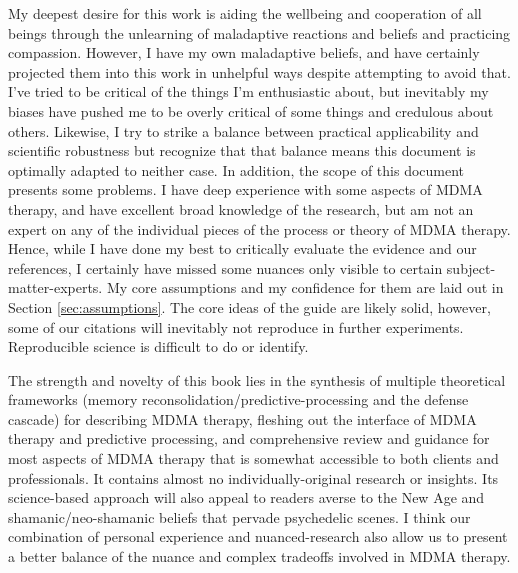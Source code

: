 \documentclass[12pt,letterpaper]{book}
\begin{document}

My deepest desire for this work is aiding the wellbeing and cooperation of all beings through the unlearning of maladaptive reactions and beliefs and practicing compassion. However, I have my own maladaptive beliefs, and have certainly projected them into this work in unhelpful ways despite attempting to avoid that. I've tried to be critical of the things I'm enthusiastic about, but inevitably my biases have pushed me to be overly critical of some things and credulous about others. Likewise, I try to strike a balance between practical applicability and scientific robustness but recognize that that balance means this document is optimally adapted to neither case. In addition, the scope of this document presents some problems. I have deep experience with some aspects of MDMA therapy, and have excellent broad knowledge of the research, but am not an expert on any of the individual pieces of the process or theory of MDMA therapy. Hence, while I have done my best to critically evaluate the evidence and our references, I certainly have missed some nuances only visible to certain subject-matter-experts. My core assumptions and my confidence for them are laid out in Section \ref{sec:assumptions}. The core ideas of the guide are likely solid, however, some of our citations will inevitably not reproduce in further experiments. Reproducible science is difficult to do or identify.


The strength and novelty of this book lies in the synthesis of multiple theoretical frameworks (memory reconsolidation/predictive-processing and the defense cascade) for describing MDMA therapy, fleshing out the interface of MDMA therapy and predictive processing, and comprehensive review and guidance for most aspects of MDMA therapy that is somewhat accessible to both clients and professionals. It contains almost no individually-original research or insights. Its science-based approach will also appeal to readers averse to the New Age and shamanic/neo-shamanic beliefs that pervade psychedelic scenes. I think our combination of personal experience and nuanced-research also allow us to present a better balance of the nuance and complex tradeoffs involved in MDMA therapy.
\end{document}
